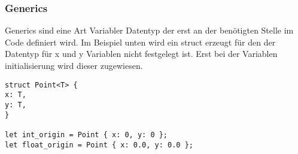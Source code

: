 \subsubsection{Generics}

Generics sind eine Art Variabler Datentyp der erst an der benötigten Stelle im Code definiert wird. Im Beispiel unten wird ein struct erzeugt für den der Datentyp für x und y Variablen nicht festgelegt ist. Erst bei der Variablen initialisierung wird dieser zugewiesen.


\begin{lstlisting}
struct Point<T> {
x: T,
y: T,
}

let int_origin = Point { x: 0, y: 0 };
let float_origin = Point { x: 0.0, y: 0.0 };
\end{lstlisting}